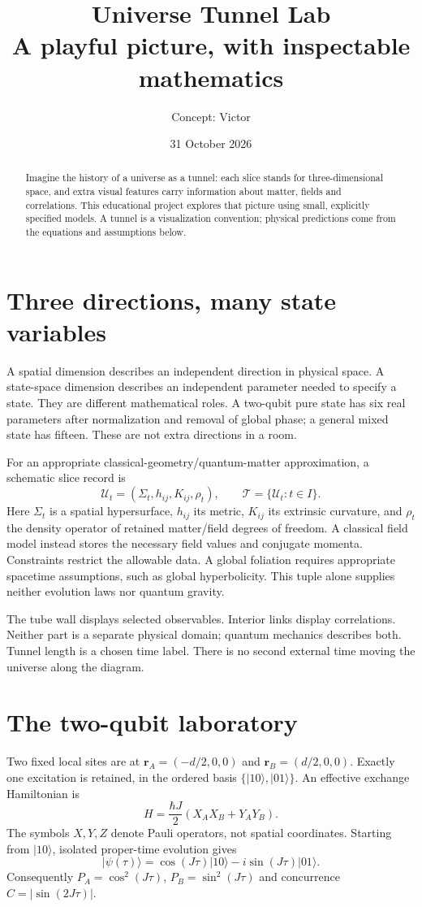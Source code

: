 \documentclass[11pt,a4paper]{article}
\title{Universe Tunnel Lab\\\large A playful picture, with inspectable mathematics}
\author{Concept: Victor}
\date{31 October 2026}
\begin{document}
\maketitle
\begin{abstract}
Imagine the history of a universe as a tunnel: each slice stands for three-dimensional space, and extra visual features carry information about matter, fields and correlations. This educational project explores that picture using small, explicitly specified models. A tunnel is a visualization convention; physical predictions come from the equations and assumptions below.
\end{abstract}
\section{Three directions, many state variables}
A spatial dimension describes an independent direction in physical space. A state-space dimension describes an independent parameter needed to specify a state. They are different mathematical roles. A two-qubit pure state has six real parameters after normalization and removal of global phase; a general mixed state has fifteen. These are not extra directions in a room.

For an appropriate classical-geometry/quantum-matter approximation, a schematic slice record is
\begin{equation}
\mathcal U_t=(\Sigma_t,h_{ij},K_{ij},\rho_t),\qquad
\mathcal T=\{\mathcal U_t:t\in I\}.
\end{equation}
Here $\Sigma_t$ is a spatial hypersurface, $h_{ij}$ its metric, $K_{ij}$ its extrinsic curvature, and $\rho_t$ the density operator of retained matter/field degrees of freedom. A classical field model instead stores the necessary field values and conjugate momenta. Constraints restrict the allowable data. A global foliation requires appropriate spacetime assumptions, such as global hyperbolicity. This tuple alone supplies neither evolution laws nor quantum gravity.

The tube wall displays selected observables. Interior links display correlations. Neither part is a separate physical domain; quantum mechanics describes both. Tunnel length is a chosen time label. There is no second external time moving the universe along the diagram.
\section{The two-qubit laboratory}
Two fixed local sites are at $\mathbf r_A=(-d/2,0,0)$ and $\mathbf r_B=(d/2,0,0)$. Exactly one excitation is retained, in the ordered basis $\{|10\rangle,|01\rangle\}$. An effective exchange Hamiltonian is
\begin{equation}
H=\frac{\hbar J}{2}(X_AX_B+Y_AY_B).
\end{equation}
The symbols $X,Y,Z$ denote Pauli operators, not spatial coordinates. Starting from $|10\rangle$, isolated proper-time evolution gives
\begin{equation}
|\psi(\tau)\rangle=\cos(J\tau)|10\rangle-i\sin(J\tau)|01\rangle.
\end{equation}
Consequently $P_A=\cos^2(J\tau)$, $P_B=\sin^2(J\tau)$ and concurrence $C=|\sin(2J\tau)|$.
\end{document}
